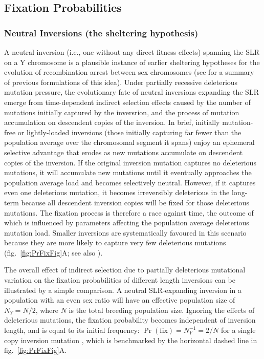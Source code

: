\documentclass{article}[12pt]
\begin{document}
\subsection*{Fixation Probabilities}

\subsubsection*{Neutral Inversions (the sheltering hypothesis)}

A neutral inversion (i.e., one without any direct fitness effects) spanning the SLR on a Y chromosome is a plausible instance of earlier sheltering hypotheses for the evolution of recombination arrest between sex chromosomes (see \citealt[][]{Olito-etal-2022} for a summary of previous formulations of this idea). Under partially recessive deleterious mutation pressure, the evolutionary fate of neutral inversions expanding the SLR emerge from time-dependent indirect selection effects caused by the number of mutations initially captured by the inversrion, and the process of mutation accumulation on descendent copies of the inversion. In brief, initially mutation-free or lightly-loaded inversions (those initially capturing far fewer than the population average over the chromosomal segment it spans) enjoy an ephemeral selective advantage that erodes as new mutations accumulate on descendent copies of the inversion. If the original inversion mutation captures no deleterious mutations, it will accumulate new mutations until it eventually approaches the population average load and becomes selectively neutral. However, if it captures even one deleterious mutation, it becomes irreversibly deleterious in the long-term because all descendent inversion copies will be fixed for those deleterious mutations. The fixation process is therefore a race against time, the outcome of which is influenced by parameters affecting the population average deleterious mutation load. Smaller inversions are systematically favoured in this scenario because they are more likely to capture very few deleterious mutations (fig.~\ref{fig:PrFixFig}A; see also \citealt{Olito-etal-2022}). 

The overall effect of indirect selection due to partially deleterious mutational variation on the fixation probabilities of different length inversions can be illustrated by a simple comparison. A neutral SLR-expanding inversion in a population with an even sex ratio will have an effective population size of $N_Y = N/2$, where $N$ is the total breeding population size. Ignoring the effects of deleterious mutations, the fixation probability becomes independent of inversion length, and is equal to its initial frequency: $\Pr(\text{fix}) = N_Y^{-1} = 2/N$ for a single copy inversion mutation \citep{Kimura1962, CrowKimura1970}, which is benchmarked by the horizontal dashed line in fig.~\ref{fig:PrFixFig}A.
\end{document}
